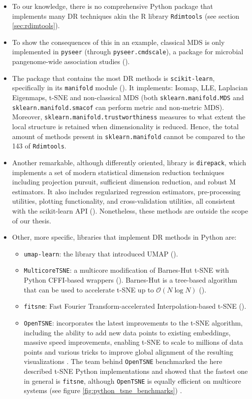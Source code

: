 \documentclass[a4paper,12pt]{article}
\begin{document}
\begin{itemize}
    \item To our knowledge, there is no comprehensive Python package that implements many DR techniques akin the R library \texttt{Rdimtools} (see section \ref{sec:rdimtools}).
    \item To show the consequences of this in an example, classical MDS is only implemented in \texttt{pyseer} (through \texttt{pyseer.cmdscale}), a package for microbial pangenome-wide association studies (\cite{Lees2018}).
    \item The package that contains the most DR methods is \texttt{scikit-learn}, specifically in its \texttt{manifold} module (\cite{Pedregosa2011}). It implements: Isomap, LLE, Laplacian Eigenmaps, t-SNE and non-classical MDS (both \texttt{sklearn.manifold.MDS} and \texttt{sklearn.manifold.smacof} can perform metric and non-metric MDS). Moreover, \texttt{sklearn.manifold.trustworthiness} measures to what extent the local structure is retained when dimensionality is reduced. Hence, the total amount of methods present in \texttt{sklearn.manifold} cannot be compared to the 143 of \texttt{Rdimtools}.
    \item Another remarkable, although differently oriented, library is \texttt{direpack}, which implements a set of modern statistical dimension reduction techniques including projection pursuit, sufficient dimension reduction, and robust M estimators. It also includes regularized regression estimators, pre-processing utilities, plotting functionality, and cross-validation utilities, all consistent with the scikit-learn API (\cite{Menvouta2023}). Nonetheless, these methods are outside the scope of our thesis.
    \item Other, more specific, libraries that implement DR methods in Python are:
    \begin{itemize}
        \item \texttt{umap-learn}: the library that introduced UMAP (\cite{McInnes2018a}).
        \item \texttt{MulticoreTSNE}: a multicore modification of Barnes-Hut t-SNE with Python CFFI-based wrappers (\cite{Ulyanov2016}). Barnes-Hut is a tree-based algorithm that can be used to accelerate t-SNE up to $\mathcal{O}(N\log N)$ (\cite{Vandermaaten2014}).
        \item \texttt{fitsne}: Fast Fourier Transform-accelerated Interpolation-based t-SNE (\cite{Linderman2019}).
        \item \texttt{OpenTSNE}: incorporates the latest improvements to the t-SNE algorithm, including the ability to add new data points to existing embeddings, massive speed improvements, enabling t-SNE to scale to millions of data points and various tricks to improve global alignment of the resulting visualizations \cite{Policar2024}. The team behind \texttt{OpenTSNE} benchmarked the here described t-SNE Python implementations and showed that the fastest one in general is \texttt{fitsne}, although \texttt{OpenTSNE} is equally efficient on multicore systems (see figure \ref{fig:python_tsne_benchmarks}) \cite{Policar2024}.

\end{itemize}
\end{itemize}
\end{document}
